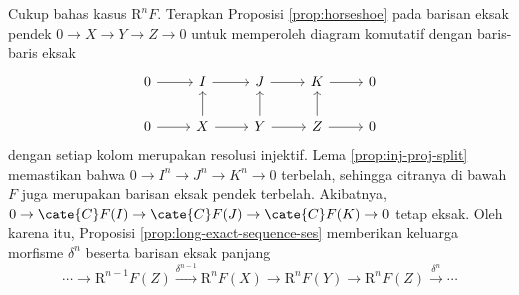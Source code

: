 \begin{bukti}
	Cukup bahas kasus $\mathrm{R}^n F$. Terapkan Proposisi \ref{prop:horseshoe} pada barisan eksak pendek $0 \to X \to Y \to Z \to 0$ untuk memperoleh diagram komutatif dengan baris-baris eksak
	\[\begin{tikzcd}
		0 \arrow[r] & I \arrow[r] & J \arrow[r] & K \arrow[r] & 0 \\
		0 \arrow[r] & X \arrow[r] \arrow[u] & Y \arrow[r] \arrow[u] & Z \arrow[r] \arrow[u] & 0
	\end{tikzcd}\]
	dengan setiap kolom merupakan resolusi injektif. Lema \ref{prop:inj-proj-split} memastikan bahwa $0 \to I^n \to J^n \to K^n \to 0$ terbelah, sehingga citranya di bawah $F$ juga merupakan barisan eksak pendek terbelah. Akibatnya, $0 \to \cate{C}F(I) \to \cate{C}F(J) \to \cate{C}F(K) \to 0$ tetap eksak. Oleh karena itu, Proposisi \ref{prop:long-exact-sequence-ses} memberikan keluarga morfisme $\delta^n$ beserta barisan eksak panjang
	\[ \cdots \to \mathrm{R}^{n-1} F(Z) \xrightarrow{\delta^{n-1}} \mathrm{R}^n F(X) \to \mathrm{R}^n F(Y) \to \mathrm{R}^n F(Z) \xrightarrow{\delta^n} \cdots \]
	

\end{bukti}
